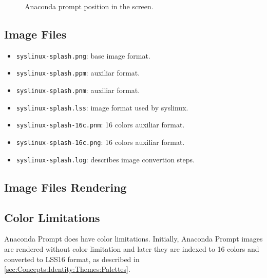 \begin{figure}[!hbp]
\begin{center}
\end{center}
\caption{Anaconda prompt position in the screen.%
   \label{fig:Distribution:Anaconda:Prompt:Models:Fig2}}
\end{figure}

\subsection{Image Files}
\hypertarget{sec:Distribution:Anaconda:Prompt:Identity:Images}{}
\label{sec:Distribution:Anaconda:Prompt:Identity:Images}

\begin{itemize}
\item \texttt{syslinux-splash.png}: base image format.
\item \texttt{syslinux-splash.ppm}: auxiliar format.
\item \texttt{syslinux-splash.pnm}: auxiliar format.
\item \texttt{syslinux-splash.lss}: image format used by syslinux.
\item \texttt{syslinux-splash-16c.pnm}: 16 colors auxiliar format.
\item \texttt{syslinux-splash-16c.png}: 16 colors auxiliar format.
\item \texttt{syslinux-splash.log}: describes image convertion steps.
\end{itemize}

\subsection{Image Files Rendering}
\hypertarget{sec:Distribution:Anaconda:Prompt:Identity:Issues}{}
\label{sec:Distribution:Anaconda:Prompt:Identity:Issues}

\subsection{Color Limitations}
\hypertarget{sec:Distribution:Anaconda:Prompt:Identity:Colors}{}
\label{sec:Distribution:Anaconda:Prompt:Identity:Colors}

Anaconda Prompt does have color limitations. Initially, Anaconda
Prompt images are rendered without color limitation and later they are
indexed to 16 colors and converted to LSS16 format, as described in
\autoref{sec:Concepts:Identity:Themes:Palettes}. 

